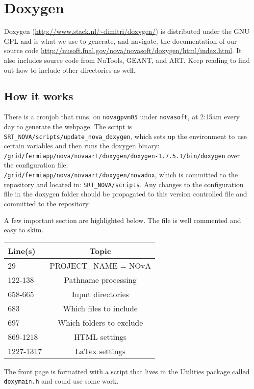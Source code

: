 \documentclass[letterpaper,10pt]{article}
\begin{document}
\section{Doxygen}
Doxygen (\url{http://www.stack.nl/~dimitri/doxygen/}) is distributed under the GNU GPL and is what we use to generate, and navigate, the documentation of our source code \url{http://nusoft.fnal.gov/nova/novasoft/doxygen/html/index.html}. It also includes source code from NuTools, GEANT, and ART. Keep reading to find out how to include other directories as well.

\subsection{How it works}
There is a cronjob that runs, on \verb|novagpvm05| under \verb|novasoft|, at 2:15am every day to generate the webpage. The script is \verb|SRT_NOVA/scripts/update_nova_doxygen|, which sets up the environment to use certain variables and then runs the doxygen binary:\\ \verb|/grid/fermiapp/nova/novaart/doxygen/doxygen-1.7.5.1/bin/doxygen| over the configuration file:\\
\verb|/grid/fermiapp/nova/novaart/doxygen/novadox|, which is committed to the repository and located in: \verb|SRT_NOVA/scripts|. Any changes to the configuration file in the doxygen folder should be propagated to this version controlled file and committed to the repository.

A few important section are highlighted below. The file is well commented and easy to skim.
\begin{center}
  \begin{tabular}{|l|c|}
    \hline
    Line(s) & Topic \\
    \hline
    29 & PROJECT\_NAME = NOvA \\
    122-138 & Pathname processing \\
    658-665 & Input directories \\
    683 & Which files to include \\
    697 & Which folders to exclude \\
    869-1218 & HTML settings \\
    1227-1317 & LaTex settings \\
    \hline
  \end{tabular} 
\end{center}

The front page is formatted with a script that lives in the Utilities package called \verb|doxymain.h| and could use some work.
\end{document}
